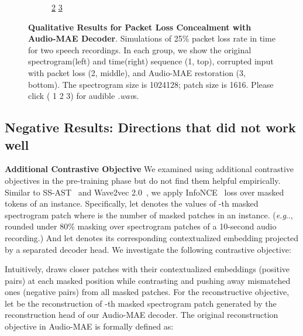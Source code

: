 \documentclass{article}
\makeatletter
\DeclareRobustCommand\onedot{\futurelet\@let@token\@onedot}
\def\@onedot{\ifx\@let@token.\else.\null\fi\xspace}
\def\eg{\emph{e.g}\onedot} \def\Eg{\emph{E.g}\onedot}
\renewcommand{\paragraph}[1]{\vspace{1.25mm}\noindent\textbf{#1}}
\makeatother
\begin{document}
\begin{figure}[h!]
\begin{subfigure}[b]{0.49\linewidth}
{            \href{https://www.dropbox.com/s/sv7lt5fzgpxrwcn/1IrYZhVhN1s_masked.mp4?dl=0}{2}
            \href{https://www.dropbox.com/s/jwz8kwgjrdrq308/1IrYZhVhN1s_restored.mp4?dl=0}{3}
        }
\label{fig:app:plc:c}
    \end{subfigure}
    \caption{
    \textbf{Qualitative Results for Packet Loss Concealment with Audio-MAE Decoder}. 
    Simulations of 25\% packet loss rate in time for two speech recordings.
    In each group, we show the original spectrogram(left) and time(right) sequence ({\color{hrefcolor}1}, top), corrupted input with packet loss ({\color{hrefcolor}2}, middle), and Audio-MAE restoration ({\color{hrefcolor}3}, bottom). 
    The spectrogram size is 1024128; patch size is 1616. 
    Please click ({\color{hrefcolor} 1 2 3})
    for audible \emph{.wav}s.
    }
    \label{fig:app:plc}
    
\end{figure}






\subsection{Negative Results: Directions that did not work well }
\label{sec:app:exp:negative}
\paragraph{Additional Contrastive Objective}
We examined using additional contrastive objectives in the pre-training phase but do not find them helpful empirically.
Similar to SS-AST~\cite{ssast} and Wave2vec 2.0~\cite{wav2vec2}, we apply InfoNCE~\cite{info_nce} loss over masked tokens of an instance. Specifically, let  denotes the values of -th masked spectrogram patch where  is the number of masked patches in an instance. (\eg, rounded  under 80\% masking over  spectrogram patches of a 10-second audio recording.)
And let  denotes its corresponding contextualized embedding projected by a separated decoder head. We investigate the following contrastive objective:




Intuitively,  draws closer patches with their contextualized embeddings (positive pairs) at each masked position while contrasting and pushing away mismatched ones (negative pairs) from all masked patches.
For the reconstructive objective, let  be the reconstruction of -th masked spectrogram patch generated by the reconstruction head of our Audio-MAE decoder. The original reconstruction objective  in Audio-MAE is formally defined as:
\end{document}
